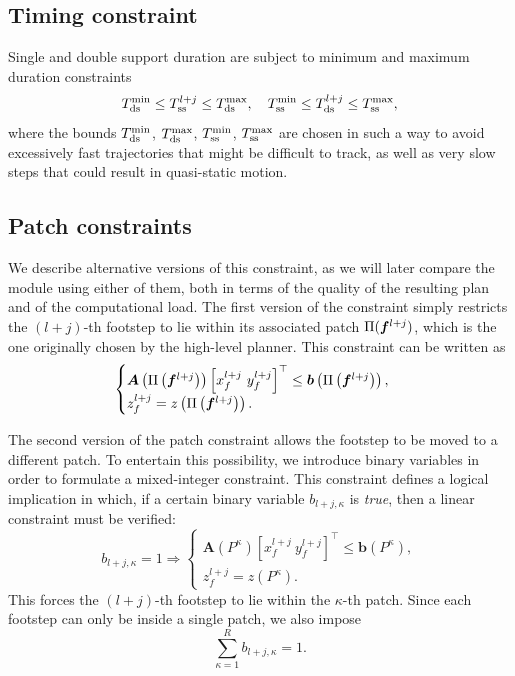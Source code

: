 \subsection{Timing constraint}
Single and double support duration are subject to minimum and maximum duration
constraints
\begin{equation}
    T_{\rm ds}^{\min} \le T_{\rm ss}^{l+j} \le T_{\rm ds}^{\max}, \quad T_{\rm ss}^{\min} \le T_{\rm ds}^{l+j} \le T_{\rm ss}^{\max},
    \label{eq:FAPA:timing-constraint}
\end{equation}
where the bounds $T_{\rm ds}^{\min}$, $T_{\rm ds}^{\max}$, $T_{\rm ss}^{\min}$, $T_{\rm ss}^{\max}$ are chosen in such a way to avoid excessively fast trajectories that might be difficult to track, as well as very slow steps that could result in quasi-static motion.

\subsection{Patch constraints}
\label{sec:FAPA:patch_constraint}
We describe alternative versions of this constraint, as we will later compare
the module using either of them, both in terms of the quality of the resulting
plan and of the computational load.
The first version of the constraint simply restricts the $(l+j)$-th footstep
to lie within its associated patch $\Pi({\bm{f}}^{l+j})$, which is the one
originally chosen by the high-level planner. This constraint can be written as
\begin{equation}
    \begin{cases}
		\bm{A}\left(\Pi\left(\bff^{l+j}\right)\right) \left[ x_f^{l+j} \ y_f^{l+j} \right]^\top \leq \bm{b}\left(\Pi\left(\bff^{l+j}\right)\right), \\
		z_f^{l+j} = z\left(\Pi\left(\bff^{l+j}\right)\right).
    \end{cases}
	\label{eq:FAPA:fixed_patch_constraint}
\end{equation}

The second version of the patch constraint allows the footstep to be moved
to a different patch. To entertain this possibility, we introduce binary
variables in order to formulate a mixed-integer constraint. This constraint
defines a logical implication in which, if a certain binary variable
$b_{l+j,\kappa}$ is {\em true}, then a linear constraint must be verified:
\begin{equation}
	b_{l+j,\kappa}=1 \Rightarrow 
	\begin{cases}
		\bm{A}\left(P^\kappa\right) \left[ x_f^{l+j} \ y_f^{l+j} \right]^\top \leq \bm{b}\left(P^\kappa\right), \\
		z_f^{l+j} = z\left(P^\kappa\right).
	\end{cases}
	\label{eq:FAPA:implication}
\end{equation}
This forces the $(l+j)$-th footstep to lie within the $\kappa$-th patch.
Since each footstep can only be inside a single patch, we also impose
\begin{equation}
    \sum^R_{\kappa=1} b_{l+j,\kappa} = 1.
    \label{eq:FAPA:sum_one}
\end{equation}

